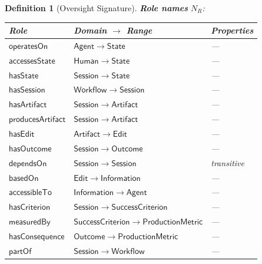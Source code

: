 \documentclass[11pt]{article}
\newtheorem{definition}{Definition}[section]
\begin{document}
\begin{definition}[Oversight Signature]
\medskip\noindent
\textbf{Role names} $N_R$:
\begin{center}
\begin{tabular}{@{}lll@{}}
\toprule
\textbf{Role} & \textbf{Domain $\to$ Range} & \textbf{Properties} \\
\midrule
$\mathsf{operatesOn}$      & $\mathsf{Agent} \to \mathsf{State}$          & --- \\
$\mathsf{accessesState}$   & $\mathsf{Human} \to \mathsf{State}$          & --- \\
$\mathsf{hasState}$        & $\mathsf{Session} \to \mathsf{State}$        & --- \\
$\mathsf{hasSession}$      & $\mathsf{Workflow} \to \mathsf{Session}$     & --- \\
$\mathsf{hasArtifact}$     & $\mathsf{Session} \to \mathsf{Artifact}$     & --- \\
$\mathsf{producesArtifact}$& $\mathsf{Session} \to \mathsf{Artifact}$     & --- \\
$\mathsf{hasEdit}$         & $\mathsf{Artifact} \to \mathsf{Edit}$        & --- \\
$\mathsf{hasOutcome}$      & $\mathsf{Session} \to \mathsf{Outcome}$      & --- \\
$\mathsf{dependsOn}$       & $\mathsf{Session} \to \mathsf{Session}$      & transitive \\
$\mathsf{basedOn}$         & $\mathsf{Edit} \to \mathsf{Information}$     & --- \\
$\mathsf{accessibleTo}$    & $\mathsf{Information} \to \mathsf{Agent}$    & --- \\
$\mathsf{hasCriterion}$    & $\mathsf{Session} \to \mathsf{SuccessCriterion}$ & --- \\
$\mathsf{measuredBy}$      & $\mathsf{SuccessCriterion} \to \mathsf{ProductionMetric}$ & --- \\
$\mathsf{hasConsequence}$  & $\mathsf{Outcome} \to \mathsf{ProductionMetric}$ & --- \\
$\mathsf{partOf}$          & $\mathsf{Session} \to \mathsf{Workflow}$     & --- \\
\bottomrule
\end{tabular}
\end{center}


\end{definition}
\end{document}
